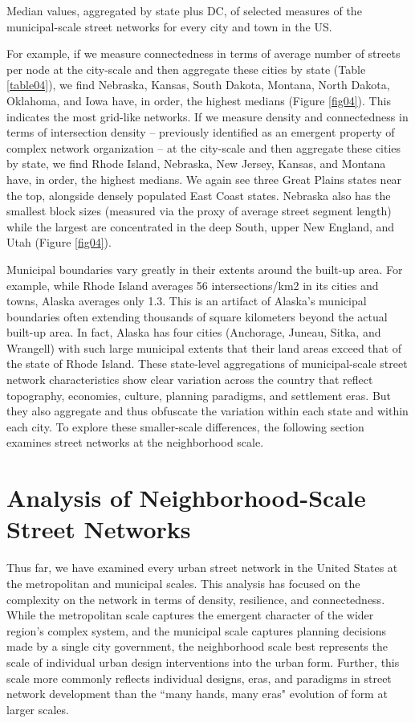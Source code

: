 \documentclass[Afour,sageh,times]{sage/sagej}
\begin{document}
\begin{table}
\caption{Median values, aggregated by state plus DC, of selected measures of the municipal-scale street networks for every city and town in the US.}
\label{table04}
\end{table}

For example, if we measure connectedness in terms of average number of streets per node at the city-scale and then aggregate these cities by state (Table \ref{table04}), we find Nebraska, Kansas, South Dakota, Montana, North Dakota, Oklahoma, and Iowa have, in order, the highest medians (Figure \ref{fig04}). This indicates the most grid-like networks. If we measure density and connectedness in terms of intersection density – previously identified as an emergent property of complex network organization – at the city-scale and then aggregate these cities by state, we find Rhode Island, Nebraska, New Jersey, Kansas, and Montana have, in order, the highest medians. We again see three Great Plains states near the top, alongside densely populated East Coast states. Nebraska also has the smallest block sizes (measured via the proxy of average street segment length) while the largest are concentrated in the deep South, upper New England, and Utah (Figure \ref{fig04}).

Municipal boundaries vary greatly in their extents around the built-up area. For example, while Rhode Island averages 56 intersections/km2 in its cities and towns, Alaska averages only 1.3. This is an artifact of Alaska's municipal boundaries often extending thousands of square kilometers beyond the actual built-up area. In fact, Alaska has four cities (Anchorage, Juneau, Sitka, and Wrangell) with such large municipal extents that their land areas exceed that of the state of Rhode Island. These state-level aggregations of municipal-scale street network characteristics show clear variation across the country that reflect topography, economies, culture, planning paradigms, and settlement eras. But they also aggregate and thus obfuscate the variation within each state and within each city. To explore these smaller-scale differences, the following section examines street networks at the neighborhood scale.

\section{Analysis of Neighborhood-Scale Street Networks}

Thus far, we have examined every urban street network in the United States at the metropolitan and municipal scales. This analysis has focused on the complexity on the network in terms of density, resilience, and connectedness. While the metropolitan scale captures the emergent character of the wider region's complex system, and the municipal scale captures planning decisions made by a single city government, the neighborhood scale best represents the scale of individual urban design interventions into the urban form. Further, this scale more commonly reflects individual designs, eras, and paradigms in street network development than the ``many hands, many eras" evolution of form at larger scales.
\end{document}
